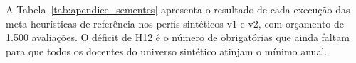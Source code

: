 
\begin{singlespace}
\makeatletter{}\makeatother
\end{singlespace}

\begin{singlespace}
\makeatletter{}\makeatother
\end{singlespace}


A Tabela~\ref{tab:apendice_sementes} apresenta o resultado de cada execução das meta-heurísticas de referência nos perfis sintéticos v1 e v2, com orçamento de 1.500 avaliações. O déficit de H12 é o número de obrigatórias que ainda faltam para que todos os docentes do universo sintético atinjam o mínimo anual.


